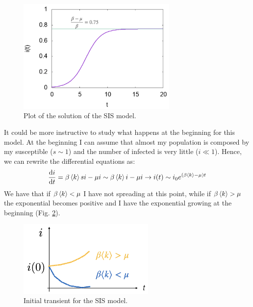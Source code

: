 \documentclass[../main/main.tex]{subfiles}
\begin{document}
\begin{figure}[h!]
\centering
\includegraphics[width=0.7\textwidth]{../lessons/image/03/3.png}
\caption{\label{fig:3_3} Plot of the solution of the SIS model.}
\end{figure}

It could be more instructive to study what happens at the beginning for this model. At the beginning I can assume that almost my population is composed by my susceptible (\( s \sim 1 \)) and the number of infected is very little (\( i \ll 1 \)).
Hence, we can rewrite the differential equations as:
\begin{equation*}
  \dv{i}{t} = \beta \expval{k} s i - \mu i \sim \beta \expval{k} i - \mu i \rightarrow i(t) \sim i_0 e^{(\beta \expval{k} - \mu  )t}
\end{equation*}
We have that if \( \beta \expval{k} < \mu   \) I have not spreading at this point, while if \( \beta \expval{k} > \mu   \) the exponential becomes positive and I have the exponential growing at the beginning (Fig. \ref{fig:3_4}).

\begin{figure}[h!]
\centering
\includegraphics[width=0.6\textwidth]{../lessons/image/03/4.png}
\caption{\label{fig:3_4} Initial transient for the SIS model.}
\end{figure}
\end{document}
